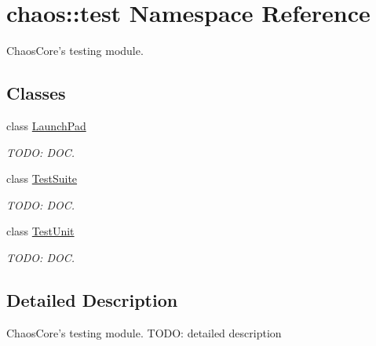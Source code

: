 \hypertarget{namespacechaos_1_1test}{\section{chaos\-:\-:test Namespace Reference}
\label{namespacechaos_1_1test}
}


Chaos\-Core's testing module.  


\subsection*{Classes}
\begin{DoxyCompactItemize}
\item 
class \hyperlink{classchaos_1_1test_1_1_launch_pad}{Launch\-Pad}
\begin{DoxyCompactList}\small\item\em T\-O\-D\-O\-: D\-O\-C. \end{DoxyCompactList}\item 
class \hyperlink{classchaos_1_1test_1_1_test_suite}{Test\-Suite}
\begin{DoxyCompactList}\small\item\em T\-O\-D\-O\-: D\-O\-C. \end{DoxyCompactList}\item 
class \hyperlink{classchaos_1_1test_1_1_test_unit}{Test\-Unit}
\begin{DoxyCompactList}\small\item\em T\-O\-D\-O\-: D\-O\-C. \end{DoxyCompactList}\end{DoxyCompactItemize}


\subsection{Detailed Description}
Chaos\-Core's testing module. T\-O\-D\-O\-: detailed description 